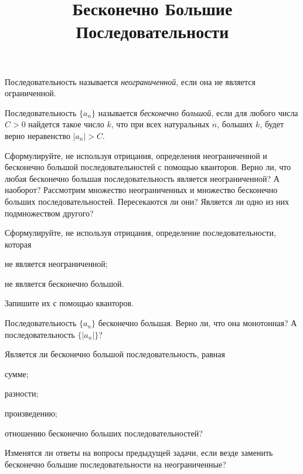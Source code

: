 \documentclass[a4paper, 12pt, num=25]{listok}
\begin{document}
\title{Бесконечно Большие Последовательности}
\maketitle{}
\begin{definition}
	Последовательность называется \textit{неограниченной}, если она не является ограниченной.
\end{definition}
\begin{definition}
	Последовательность $\{a_n\}$ называется \textit{бесконечно большой}, если для любого числа $C > 0$ найдется такое число $k$,
	что при всех натуральных $n$, больших $k$, будет верно неравенство $|a_n| > C$.
\end{definition}
\begin{problem}
	Сформулируйте, не используя отрицания, определения неограниченной и бесконечно большой последовательностей с помощью кванторов.
	Верно ли, что любая бесконечно большая последовательность является неограниченной? А наоборот?
	Рассмотрим множество неограниченных и множество бесконечно больших последовательностей. Пересекаются ли они?
	Является ли одно из них подмножеством другого?
\end{problem}
\begin{problem}
	Сформулируйте, не используя отрицания, определение последовательности, которая
	\begin{probparts}
		\item не является неограниченной;
		\item не является бесконечно большой.
	\end{probparts}
	Запишите их с помощью кванторов.
\end{problem}
\begin{problem}
	Последовательность $\{a_n\}$ бесконечно большая. Верно ли, что она монотонная?
	А последовательность $\{|a_n|\}$?
\end{problem}
\begin{problem}
	Является ли бесконечно большой последовательность, равная
	\begin{probparts}
		\item сумме;
		\item разности;
		\item произведению;
		\item отношению бесконечно больших последовательностей?
	\end{probparts}
\end{problem}
\begin{problem}
	Изменятся ли ответы на вопросы предыдущей задачи, если везде заменить бесконечно большие последовательности на неограниченные?
\end{problem}
\end{document}
